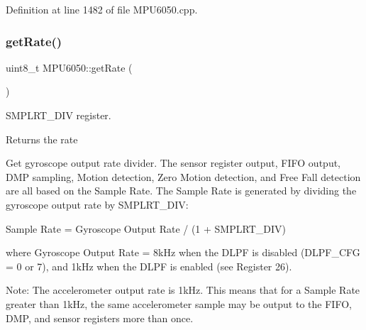 Definition at line 1482 of file M\+P\+U6050.\+cpp.


\begin{DoxyCode}{0}

\end{DoxyCode}
\mbox{\label{classMPU6050_a887a173e079980505763ffd1aa9fec05}} 
\subsubsection{\texorpdfstring{getRate()}{getRate()}}
{\footnotesize\ttfamily uint8\+\_\+t M\+P\+U6050\+::get\+Rate (\begin{DoxyParamCaption}{ }\end{DoxyParamCaption})}

S\+M\+P\+L\+R\+T\+\_\+\+D\+IV register.

\begin{DoxyReturn}{Returns}
the rate
\end{DoxyReturn}
Get gyroscope output rate divider. The sensor register output, F\+I\+FO output, D\+MP sampling, Motion detection, Zero Motion detection, and Free Fall detection are all based on the Sample Rate. The Sample Rate is generated by dividing the gyroscope output rate by S\+M\+P\+L\+R\+T\+\_\+\+D\+IV\+:

Sample Rate = Gyroscope Output Rate / (1 + S\+M\+P\+L\+R\+T\+\_\+\+D\+IV)

where Gyroscope Output Rate = 8k\+Hz when the D\+L\+PF is disabled (D\+L\+P\+F\+\_\+\+C\+FG = 0 or 7), and 1k\+Hz when the D\+L\+PF is enabled (see Register 26).

Note\+: The accelerometer output rate is 1k\+Hz. This means that for a Sample Rate greater than 1k\+Hz, the same accelerometer sample may be output to the F\+I\+FO, D\+MP, and sensor registers more than once.

